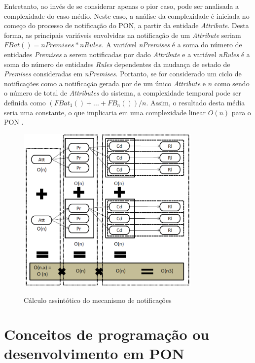 Entretanto, ao invés de se considerar apenas o pior caso, pode ser analisada a
complexidade do caso médio. Neste caso, a análise da complexidade é iniciada no
começo do processo de notificação do PON, a partir da entidade
\textit{Attribute}. Desta forma, as principais variáveis envolvidas na
notificação de um \textit{Attribute} seriam $FBat() = nPremises * nRules$. A
variável \textit{nPremises} é a soma do número de entidades \textit{Premises} a
serem notificadas por dado \textit{Attribute} e a variável \textit{nRules} é a
soma do número de entidades \textit{Rules} dependentes da mudança de estado de
\textit{Premises} consideradas em \textit{nPremises}. Portanto, se for
considerado um ciclo de notificações como a notificação gerada por de um único
\textit{Attribute} e $n$ como sendo o número de total de \textit{Attributes} do
sistema, a complexidade temporal pode ser definida como $(FBat_{1}()+ ... +
FB_{n}()) / n$. Assim, o resultado desta média seria uma constante, o que
implicaria em uma complexidade linear $O(n)$ para o PON
\cite{doc_simao_2005,msc_Ronszcka_2012,doc_ronszcka_2019}.

\begin{figure}[!htb]
  \centering
  \caption{Cálculo assintótico do mecanismo de notificações}
  \includegraphics[width=0.8\textwidth]{../figures/calculo_pon.png}
  \smallskip
  \label{fig:calculo_pon}
\end{figure}

\section{Conceitos de programação ou desenvolvimento em
  PON}\label{sec:conceitos_pon}

